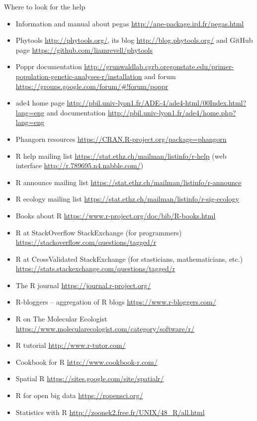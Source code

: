 \documentclass[compress, ucs, xelatex, 11pt, xcolor=svgnames,
  hyperref={
    bookmarks=true,
    unicode=true,
    colorlinks=true,
    pdftitle={Molecular data in R},
    plainpages=false,
    pdfauthor={Vojtech Zeisek},
    pdfsubject={Course about phylogeny and evolution in R},
    pdfcreator={XeLaTeX},
    pdfkeywords={R, evolution, phylogeny, molecular data},
    linkcolor=Tomato,
    anchorcolor=SaddleBrown,
    citecolor=Goldenrod,
    filecolor=DarkMagenta,
    menucolor=Sienna,
    urlcolor=DarkTurquoise,
    pdftex},
  url={hyphens, lowtilde} %
  ]{beamer}
\begin{document}
\begin{frame}[allowframebreaks]{Where to look for the help}
\begin{itemize}
    \item Information and manual about pegas \url{http://ape-package.ird.fr/pegas.html}
    \item Phytools \url{http://phytools.org/}, its blog \url{http://blog.phytools.org/} and GitHub page \url{https://github.com/liamrevell/phytools}
    \item Poppr documentation \url{http://grunwaldlab.cgrb.oregonstate.edu/primer-population-genetic-analyses-r/installation} and forum \url{https://groups.google.com/forum/\#!forum/poppr}
    \item ade4 home page \url{http://pbil.univ-lyon1.fr/ADE-4/ade4-html/00Index.html?lang=eng} and documentation \url{http://pbil.univ-lyon1.fr/ade4/home.php?lang=eng}
    \item Phangorn resources \url{https://CRAN.R-project.org/package=phangorn}
    \item R help mailing list \url{https://stat.ethz.ch/mailman/listinfo/r-help} (web interface \url{http://r.789695.n4.nabble.com/})
    \item R announce mailing list \url{https://stat.ethz.ch/mailman/listinfo/r-announce}
    \item R ecology mailing list \url{https://stat.ethz.ch/mailman/listinfo/r-sig-ecology}
    \item Books about R \url{https://www.r-project.org/doc/bib/R-books.html}
    \item R at StackOverflow StackExchange (for programmers) \url{https://stackoverflow.com/questions/tagged/r}
    \item R at CrossValidated StackExchange (for stasticians, mathematicians, etc.) \url{https://stats.stackexchange.com/questions/tagged/r}
    \item The R journal \url{https://journal.r-project.org/}
    \item R-bloggers -- aggregation of R blogs \url{https://www.r-bloggers.com/}
    \item R on The Molecular Ecologist \url{https://www.molecularecologist.com/category/software/r/}
    \item R tutorial \url{http://www.r-tutor.com/}
    \item Cookbook for R  \url{http://www.cookbook-r.com/}
    \item Spatial R \url{https://sites.google.com/site/spatialr/}
    \item R for open big data \url{https://ropensci.org/}
    \item Statistics with R \url{http://zoonek2.free.fr/UNIX/48_R/all.html}

\end{itemize}
\end{frame}
\end{document}
